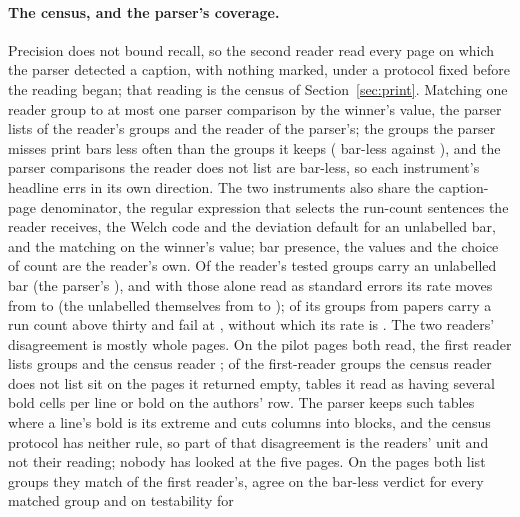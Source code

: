 \documentclass[sigconf,anonymous]{aamas}
\begin{document}
\paragraph{The census, and the parser's coverage.} Precision does not
bound recall, so the second reader read every page on which the parser
detected a caption, with nothing marked, under a protocol fixed before
the reading began; that reading is the census of Section~\ref{sec:print}.
Matching one reader group to at most one parser comparison by the
winner's value, the parser lists
\nCzReaderFoundPct{} of the reader's groups and the reader
\nCzPipeFoundPct{} of the parser's; the groups the parser misses print
bars less often than the groups it keeps (\nCzUnmatchedNeither{} bar-less
against \nCzMatchedNeither{}), and the parser comparisons the reader does
not list are \nCzPipeUnconfirmedNeither{} bar-less, so each instrument's
headline errs in its own direction. The two instruments also share the
caption-page denominator, the regular expression that selects the
run-count sentences the reader receives, the Welch code and the
deviation default for an unlabelled bar, and the matching on the winner's
value; bar presence, the values and the choice of count are the reader's
own. Of the reader's tested groups \nCzReaderUnlabelledPct{} carry an
unlabelled bar (the parser's \nBarsUnlabelledPct{}), and with those alone
read as standard errors its rate moves from \nCzReaderFail{} to
\nCzReaderSeFail{} (the unlabelled \nCzReaderUnlabelledN{} themselves from
\nCzReaderUnlabelledAsSdFail{} to \nCzReaderUnlabelledAsSeFail{});
\nCzReaderBigN{} of its groups from \nCzReaderBigNPapers{} papers carry a
run count above thirty and fail at \nCzReaderBigNFail{}, without which its
rate is \nCzReaderWithoutBigNFail{}. The two readers' disagreement is
mostly whole pages. On the \nCcrPages{} pilot pages both read, the first
reader lists \nCcrFirstGroups{} groups and the census reader
\nCcrSecondGroups{}; \nCcrUnmatchedOnEmptyPages{} of the
\nCcrFirstUnmatched{} first-reader groups the census reader does not list
sit on the \nCcrPagesSecondEmpty{} pages it returned empty, tables it read
as having several bold cells per line or bold on the authors' row. The
parser keeps such tables where a line's bold is its extreme and cuts
columns into blocks, and the census protocol has neither rule, so part of
that disagreement is the readers' unit and not their reading; nobody has
looked at the five pages. On the \nCcrSharedPages{} pages both list
groups they match \nCcrSharedMatchedPct{} of the first reader's, agree on
the bar-less verdict for every matched group and on testability for
\end{document}
